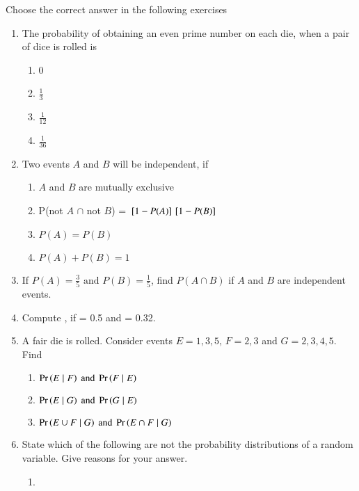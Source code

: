 Choose the correct answer in the following exercises
\begin{enumerate}[resume*]
\item The probability of obtaining an even prime number on each die, when a pair of dice is rolled is
\begin{enumerate}
\item 0
\item $\frac{1}{3}$
\item $\frac{1}{12}$
\item $\frac{1}{36}$
\end{enumerate}
\item Two events $A$ and $B$ will be independent, if
\begin{enumerate}
\item $A$ and $B$ are mutually exclusive
	\label{it:ncert/12/13/2/18/}
\item P(not $A$ $\cap$ not $B$) = ${}\left[1-P(A)\right]{}\left[1-P(B)\right] $
\item $P(A) = P(B)$
\item $P(A) + P(B) = 1$
\end{enumerate}
\solution

%
\item If $P(A)=\frac{3}{5} \text{ and } P(B)=\frac{1}{5}$, find $P(A\cap B)$ if $A$ and $B$ are independent events.
\item Compute  , if  = 0.5 and  = 0.32.\\
	\solution
	
\item A fair die is rolled. Consider events $E=1,3,5,\, F=2,3$ and $G=2,3,4,5$. Find
\begin{enumerate}
\item $\Pr\left(E \mid F\right) \text{ and } \Pr\left(F \mid E\right)$
\item $\Pr\left(E \mid G\right) \text{ and } \Pr\left(G \mid E\right)$
\item $\Pr\left({E \cup F} \mid G\right) \text{ and } \Pr\left({E \cap F} \mid G\right)$
\end{enumerate}
%
\solution

\item State which of the following are not the probability distributions of a random
variable. Give reasons for your answer.
 \begin{enumerate}
  \item
\begin{table}[h! ]
 \caption{}
\label{tab:ncert/12/13/4/1/1}

 \end{table}
 

\end{enumerate}
\end{enumerate}
